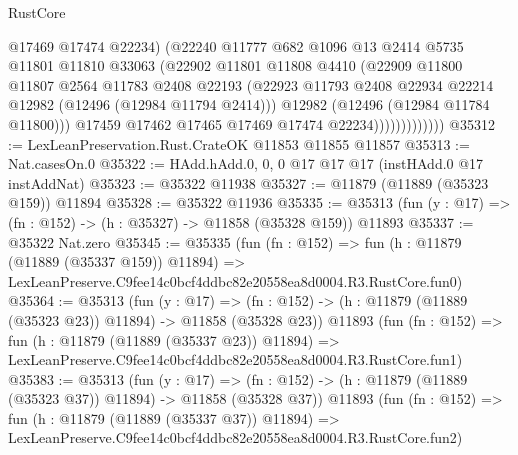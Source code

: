 \begin{lexlean}{RustCore}
\begin{coremodule}
                            @17469
                            @17474
                            @22234)
                          (@22240
                            @11777
                            @682
                            @1096
                            @13
                            @2414
                            @5735
                            @11801
                            @11810
                            @33063
                            (@22902
                              @11801
                              @11808
                              @4410
                              (@22909
                                @11800
                                @11807
                                @2564
                                @11783
                                @2408
                                @22193
                                (@22923
                                  @11793
                                  @2408
                                  @22934
                                  @22214
                                  @12982
                                  (@12496 (@12984 @11794 @2414)))
                                @12982
                                (@12496 (@12984 @11784 @11800)))
                              @17459
                              @17462
                              @17465
                              @17469
                              @17474
                              @22234)))))))))))))
@35312 := LexLeanPreservation.Rust.CrateOK @11853 @11855 @11857
@35313 := Nat.casesOn.{0}
@35322 := HAdd.hAdd.{0, 0, 0} @17 @17 @17 (instHAdd.{0} @17 instAddNat)
@35323 := @35322 @11938
@35327 := @11879 (@11889 (@35323 @159)) @11894
@35328 := @35322 @11936
@35335 := @35313 (fun (y : @17) => (fn : @152) -> (h : @35327) -> @11858 (@35328 @159)) @11893
@35337 := @35322 Nat.zero
@35345 := @35335
    (fun (fn : @152) =>
    fun (h : @11879 (@11889 (@35337 @159)) @11894) =>
    LexLeanPreserve.C9fee14c0bcf4ddbc82e20558ea8d0004.R3.RustCore.fun0)
@35364 := @35313
    (fun (y : @17) =>
    (fn : @152) -> (h : @11879 (@11889 (@35323 @23)) @11894) -> @11858 (@35328 @23))
    @11893
    (fun (fn : @152) =>
    fun (h : @11879 (@11889 (@35337 @23)) @11894) =>
    LexLeanPreserve.C9fee14c0bcf4ddbc82e20558ea8d0004.R3.RustCore.fun1)
@35383 := @35313
    (fun (y : @17) =>
    (fn : @152) -> (h : @11879 (@11889 (@35323 @37)) @11894) -> @11858 (@35328 @37))
    @11893
    (fun (fn : @152) =>
    fun (h : @11879 (@11889 (@35337 @37)) @11894) =>
    LexLeanPreserve.C9fee14c0bcf4ddbc82e20558ea8d0004.R3.RustCore.fun2)

\end{coremodule}
\end{lexlean}
